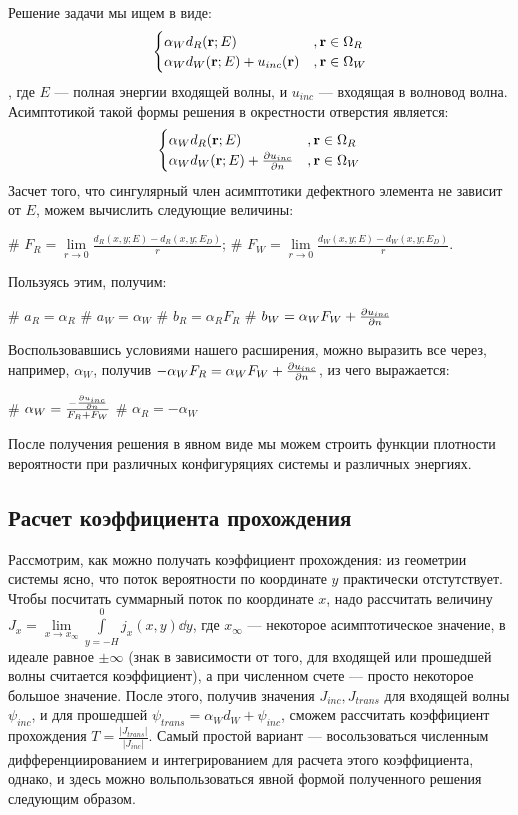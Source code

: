 Решение задачи мы ищем в виде:
\[
\begin{cases}
\alpha_W d_R(\vb{r}; E) &, \vb{r} \in \Omega_R \\
\alpha_W d_W(\vb{r}; E) + u_{inc}(\vb{r})&, \vb{r} \in \Omega_W
\end{cases}
\], где $E$ — полная энергии входящей волны, и $u_{inc}$ — входящая в волновод волна. Асимптотикой такой формы решения в окрестности отверстия является:
\[
\begin{cases}
\alpha_W d_R(\vb{r}; E) &, \vb{r} \in \Omega_R \\
\alpha_W d_W(\vb{r}; E) + \pdv{u_{inc}}{n} (\vb{r}) &, \vb{r} \in \Omega_W
\end{cases}
\]
Засчет того, что сингулярный член асимптотики дефектного элемента не зависит от $E$, можем вычислить следующие величины:
\begin{ilist}
# $F_R = \lim\limits_{r \to 0} \frac{d_R(x, y; E) - d_R(x, y; E_D)}{r}$;
# $F_W = \lim\limits_{r \to 0} \frac{d_W(x, y; E) - d_W(x, y; E_D)}{r}$.
\end{ilist}

Пользуясь этим, получим:
\begin{ilist}
# $a_R = \alpha_R$
# $a_W = \alpha_W$
# $b_R = \alpha_R F_R$
# $b_W = \alpha_W F_W + \pdv{u_{inc}}{n} (\vb{0})$
\end{ilist}

Воспользовавшись условиями нашего расширения, можно выразить все через, например, $\alpha_W$, получив $-\alpha_W F_R = \alpha_W F_W  + \pdv{u_{inc}}{n} (\vb{0})$, из чего выражается:
\begin{ilist}
# $\alpha_W = \frac{-\pdv{u_{inc}}{n} (\vb{0})}{F_R + F_W}$
# $\alpha_R = - \alpha_W$
\end{ilist}

После получения решения в явном виде мы можем строить функции плотности вероятности при различных конфигуряциях системы и различных энергиях.

\subsection{Расчет коэффициента прохождения}
Рассмотрим, как можно получать коэффициент прохождения: из геометрии системы ясно, что поток вероятности по координате $y$ практически отстутствует. Чтобы посчитать суммарный поток по координате $x$, надо рассчитать величину $J_x = \lim\limits_{x \to x_\infty} \int\limits_{y = -H}^0 j_x(x, y) \dd{y}$, где $x_\infty$ — некоторое асимптотическое значение, в идеале равное $\pm \infty$ (знак в зависимости от того, для входящей или прошедшей волны считается коэффициент), а при численном счете — просто некоторое большое значение. После этого, получив значения $J_{inc}, J_{trans}$ для входящей волны $\psi_{inc}$, и для прошедшей $\psi_{trans} = \alpha_W d_W + \psi_{inc}$, сможем рассчитать коэффициент прохождения $T = \frac{|J_{trans}|}{|J_{inc}|}$. Самый простой вариант — восользоваться численным дифференциированием и интегрированием для расчета этого коэффициента, однако, и здесь можно вольпользоваться явной формой полученного решения следующим образом.

